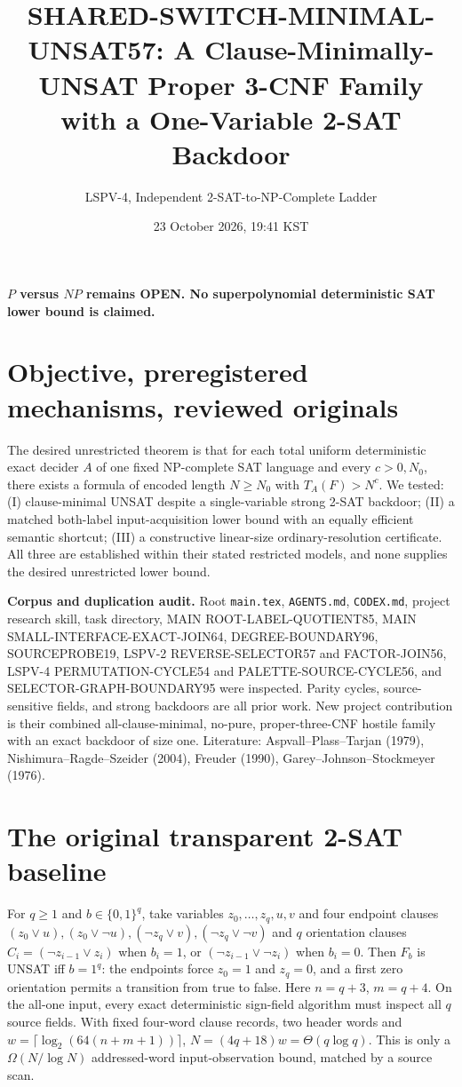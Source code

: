 \documentclass[11pt]{article}
\title{SHARED-SWITCH-MINIMAL-UNSAT57: A Clause-Minimally-UNSAT Proper 3-CNF Family with a One-Variable 2-SAT Backdoor}
\author{LSPV-4, Independent 2-SAT-to-NP-Complete Ladder}
\date{23 October 2026, 19:41 KST}
\begin{document}
\maketitle
\begin{center}\textbf{$P$ versus $NP$ remains OPEN. No superpolynomial deterministic SAT lower bound is claimed.}\end{center}
\section{Objective, preregistered mechanisms, reviewed originals}
The desired unrestricted theorem is that for each total uniform deterministic exact decider $A$ of one fixed NP-complete SAT language and every $c>0,N_0$, there exists a formula of encoded length $N\ge N_0$ with $T_A(F)>N^c$. We tested: (I) clause-minimal UNSAT despite a single-variable strong 2-SAT backdoor; (II) a matched both-label input-acquisition lower bound with an equally efficient semantic shortcut; (III) a constructive linear-size ordinary-resolution certificate. All three are established within their stated restricted models, and none supplies the desired unrestricted lower bound.

\noindent\textbf{Corpus and duplication audit.} Root \texttt{main.tex}, \texttt{AGENTS.md}, \texttt{CODEX.md}, project research skill, task directory, MAIN ROOT-LABEL-QUOTIENT85, MAIN SMALL-INTERFACE-EXACT-JOIN64, DEGREE-BOUNDARY96, SOURCEPROBE19, LSPV-2 REVERSE-SELECTOR57 and FACTOR-JOIN56, LSPV-4 PERMUTATION-CYCLE54 and PALETTE-SOURCE-CYCLE56, and SELECTOR-GRAPH-BOUNDARY95 were inspected. Parity cycles, source-sensitive fields, and strong backdoors are all prior work. New project contribution is their combined all-clause-minimal, no-pure, proper-three-CNF hostile family with an exact backdoor of size one. Literature: Aspvall--Plass--Tarjan (1979), Nishimura--Ragde--Szeider (2004), Freuder (1990), Garey--Johnson--Stockmeyer (1976).

\section{The original transparent 2-SAT baseline}
For $q\ge1$ and $b\in\{0,1\}^q$, take variables $z_0,\ldots,z_q,u,v$ and four endpoint clauses
$(z_0\vee u),(z_0\vee\neg u),(\neg z_q\vee v),(\neg z_q\vee\neg v)$
and $q$ orientation clauses $C_i=(\neg z_{i-1}\vee z_i)$ when $b_i=1$, or $(\neg z_{i-1}\vee\neg z_i)$ when $b_i=0$.
Then $F_b$ is UNSAT iff $b=1^q$: the endpoints force $z_0=1$ and $z_q=0$, and a first zero orientation permits a transition from true to false. Here $n=q+3$, $m=q+4$. On the all-one input, every exact deterministic sign-field algorithm must inspect all $q$ source fields. With fixed four-word clause records, two header words and $w=\lceil\log_2(64(n+m+1))\rceil$, $N=(4q+18)w=\Theta(q\log q)$. This is only a $\Omega(N/\log N)$ addressed-word input-observation bound, matched by a source scan.
\end{document}
